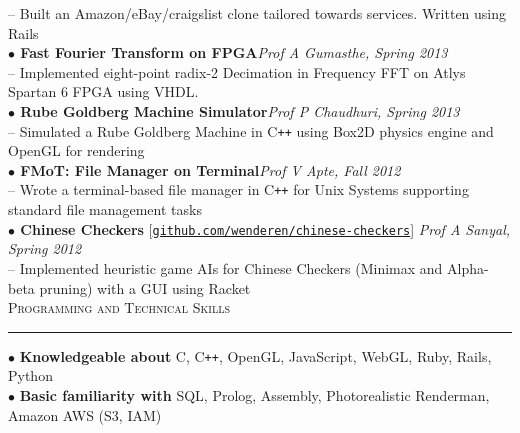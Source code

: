 \documentclass[a4paper,9pt]{article}
\begin{document}
-- Built an Amazon/eBay/craigslist clone tailored towards services. Written using Rails\\
\textbf{$\bullet$ Fast Fourier Transform on FPGA}\hfill \textit{Prof A Gumasthe, Spring 2013}\\
-- Implemented eight-point radix-2 Decimation in Frequency FFT on Atlys Spartan 6 FPGA using VHDL.\\
\textbf{$\bullet$ Rube Goldberg Machine Simulator}\hfill \textit{Prof P Chaudhuri, Spring 2013}\\
-- Simulated a Rube Goldberg Machine in C\verb!++! using Box2D physics engine and OpenGL for rendering\\
\textbf{$\bullet$ FMoT: File Manager on Terminal}\hfill \textit{Prof V Apte, Fall 2012}\\
-- Wrote a terminal-based file manager in C\texttt{++} for Unix Systems supporting standard file management tasks\\
\textbf{$\bullet$ Chinese Checkers} [\href{https://github.com/wenderen/chinese-checkers}{\texttt{github.com/wenderen/chinese-checkers}}] \hfill \textit{Prof A Sanyal, Spring 2012}\\
-- Implemented heuristic game AIs for Chinese Checkers (Minimax and Alpha-beta pruning) with a GUI using Racket\\

\Large{\textsc{Programming and Technical Skills}}\vspace{1.5pt}
\hrule\vspace{0.25cm}
\small
$\bullet$ \textbf{Knowledgeable about} C, C\verb!++!, OpenGL, JavaScript, WebGL, Ruby, Rails, Python\\
$\bullet$ \textbf{Basic familiarity with} SQL, Prolog, Assembly, Photorealistic Renderman, Amazon AWS (S3, IAM)\\
\end{document}
